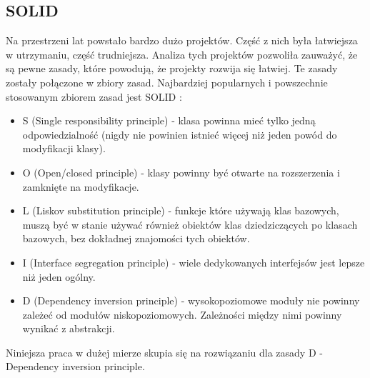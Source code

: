 \documentclass[12pt]{article}
\begin{document}
\subsection{SOLID}
Na przestrzeni lat powstało bardzo dużo projektów. Część z nich była łatwiejsza w utrzymaniu, część trudniejsza. Analiza tych projektów pozwoliła zauważyć, że są pewne zasady, które powodują, że projekty rozwija się łatwiej. Te zasady zostały połączone w zbiory zasad. Najbardziej popularnych i powszechnie stosowanym zbiorem zasad jest SOLID \cite{SOLID}:
\begin{itemize}
	\item S (Single responsibility principle) - klasa powinna mieć tylko jedną odpowiedzialność (nigdy nie powinien istnieć więcej niż jeden powód do modyfikacji klasy).
	\item O (Open/closed principle) - klasy powinny być otwarte na rozszerzenia i zamknięte na modyfikacje.
	\item L (Liskov substitution principle) - funkcje które używają klas bazowych, muszą być w stanie używać również obiektów klas dziedziczących po klasach bazowych, bez dokładnej znajomości tych obiektów.
	\item I (Interface segregation principle) - wiele dedykowanych interfejsów jest lepsze niż jeden ogólny.
	\item D (Dependency inversion principle) - wysokopoziomowe moduły nie powinny zależeć od modułów niskopoziomowych. Zależności między nimi powinny wynikać z abstrakcji.
\end{itemize}
Niniejsza praca w dużej mierze skupia się na rozwiązaniu dla zasady D - Dependency inversion principle. 
\end{document}
